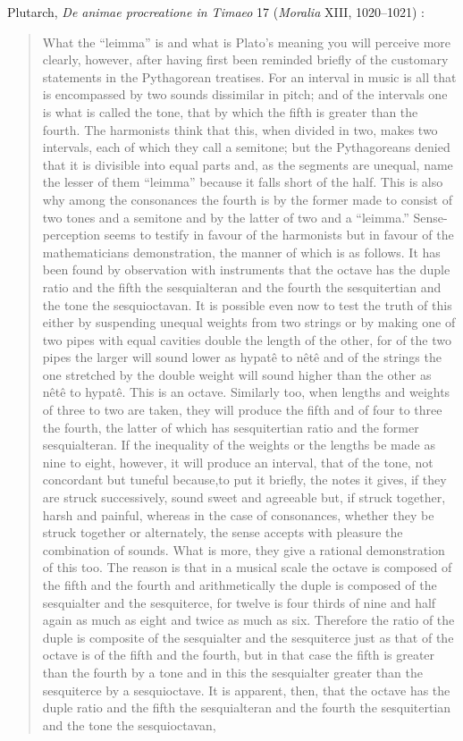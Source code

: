 \documentclass{amsart}
\theoremstyle{definition}
\begin{document}
Plutarch, {\em De animae procreatione in Timaeo} 17 ({\em Moralia} XIII, 1020--1021) \cite[pp.~303--309]{LCL427}:

\begin{quote}
What the ``leimma'' is and what is Plato's meaning you will perceive more clearly, however, after having first been reminded briefly of the customary statements in the Pythagorean treatises. For an interval in music is all that is encompassed by two sounds dissimilar in pitch; and of the intervals one is what is called the tone, that by which the fifth is greater than
the fourth. The harmonists think that this, when divided in two, makes two intervals, each of which they call a semitone; but the Pythagoreans denied that it is divisible into equal
parts and, as the segments are unequal, name the lesser of them ``leimma'' because it falls short of the half. This is also why among the consonances the fourth is by the former 
made to consist of two tones and a semitone and by the latter of two and a ``leimma.'' Sense-perception seems to testify in favour of the harmonists but in favour of the
mathematicians demonstration, the manner of which is
as follows. It has been found by observation with instruments that the octave has the duple ratio and the fifth the sesquialteran and the fourth the sesquitertian and the tone
the sesquioctavan. It is possible even now to test the truth of this either by suspending unequal weights from two strings or by making one of two pipes with equal cavities double
the length of the other, for of the two pipes the larger will sound lower as hypat\^e to n\^et\^e and of the strings the one stretched by the double weight will 
sound higher than the other as n\^et\^e to hypat\^e. This is an octave. Similarly too, when lengths and weights of three to two are taken, they will produce the fifth and of four to three
the fourth, the latter of which has sesquitertian ratio and the former sesquialteran. If the inequality of the weights or the
lengths be made as nine to eight, however, it will produce an interval, that of the tone, not concordant but tuneful because,to put it briefly, the notes it gives, if they are struck 
successively, sound sweet and agreeable but, if struck together, harsh and painful, whereas in the case of consonances, whether they be struck together or alternately, the sense
accepts with pleasure the combination of sounds. What is more, they give a rational demonstration of this too. The reason is that in a musical scale the octave is composed of the 
fifth and the fourth and arithmetically the duple is composed of the sesquialter and the sesquiterce, for twelve is four thirds of nine and half again as much as eight and twice as
much as six. Therefore the ratio of the duple is composite of the sesquialter and the sesquiterce just as that of the octave is of the fifth and the fourth, but in that case the fifth is 
greater than the fourth by a tone and in this the sesquialter greater than the sesquiterce by a sesquioctave. It is apparent, then, that the octave
has the duple ratio and the fifth the sesquialteran and the fourth the sesquitertian and the tone the sesquioctavan,
\end{quote}
\end{document}

